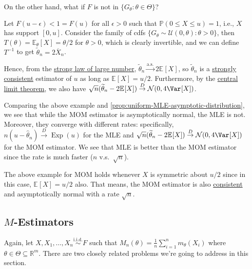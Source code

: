 On the other hand, what if \(F\) is not in \(\{ G_\theta \colon \theta \in \Theta \} \)?

\begin{eg}[Uniform]
	Let \(F(u - \epsilon ) < 1 = F(u)\) for all \(\epsilon > 0\) such that \(\mathbb{P} (0 \leq X \leq u) = 1\), i.e., \(X\) has support \([0, u]\). Consider the family of cdfs \(\{ G_\theta \sim \mathcal{U} (0, \theta ) \colon \theta > 0 \} \), then \(T(\theta ) = \mathbb{E}_{\theta }[X] = \theta / 2 \) for \(\theta > 0\), which is clearly invertible, and we can define \(T^{-1} \) to get \(\widetilde{\theta} _n = 2 \overline{X} _n\).

	Hence, from the \hyperref[thm:SLLN]{strong law of large number}, \(\widetilde{\theta} _n \overset{\text{a.s.} }{\to} 2 \mathbb{E}_{}[X] \), so \(\widetilde{\theta} _n\) is a \hyperref[def:strongly-consistent]{strongly consistent} estimator of \(u\) as long as \(\mathbb{E}_{}[X] = u / 2\). Furthermore, by the \hyperref[thm:CLT]{central limit theorem}, we also have \(\sqrt{n} (\widetilde{\theta} _n - 2 \mathbb{E}_{}[X] ) \overset{D}{\to} \mathcal{N} (0, 4 \Var_{}[X] )\).
\end{eg}

Comparing the above example and \autoref{prop:uniform-MLE-asymptotic-distribution}, we see that while the MOM estimator is asymptotically normal, the MLE is not. Moreover, they converge with different rates: specifically, \(n(u - \hat{\theta} _n) \overset{D}{\to} \operatorname{Exp}(u) \) for the MLE and \(\sqrt{n} (\widetilde{\theta} _n - 2 \mathbb{E}_{}[X] ) \overset{D}{\to} \mathcal{N} (0, 4 \Var_{}[X] )\) for the MOM estimator. We see that MLE is better than the MOM estimator since the rate is much faster (\(n\) v.s.\ \(\sqrt{n} \)).

\begin{remark}
	The above example for MOM holds whenever \(X\) is symmetric about \(u / 2\) since in this case, \(\mathbb{E}_{}[X] = u / 2\) also. That means, the MOM estimator is also \hyperref[def:consistent]{consistent} and asymptotically normal with a rate \(\sqrt{n} \).
\end{remark}

\subsection{\(M\)-Estimators}
Again, let \(X, X_1, \dots , X_n \overset{\text{i.i.d.} }{\sim } F\) such that \(M_n(\theta ) = \frac{1}{n}\sum_{i=1}^{n} m_\theta (X_i)\) where \(\theta \in \Theta \subseteq \mathbb{R} ^m\). There are two closely related problems we're going to address in this section.

